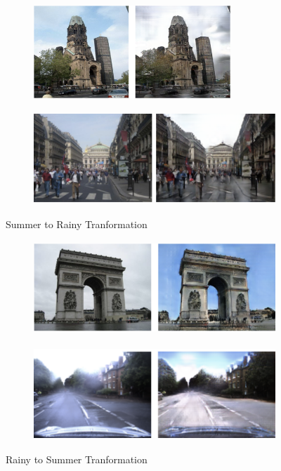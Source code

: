 \documentclass{article}
\begin{document}
\begin{figure}[H]
	\begin{subfigure}{0.5\textwidth}
		\centering
		\includegraphics[width=0.9\linewidth, height=35mm]{images/s2m_1}
	\end{subfigure}
	\begin{subfigure}{.5\textwidth}
		\centering
		\includegraphics[width=.9\linewidth,height=35mm]{images/s2m_2.png}
	\end{subfigure}
	\caption{Summer to Rainy Tranformation}
	\begin{subfigure}{0.5\textwidth}
		\centering
		\includegraphics[width=0.9\linewidth, height=35mm]{images/m2s_1.png}
	\end{subfigure}
	\begin{subfigure}{.5\textwidth}
		\centering
		\includegraphics[width=.9\linewidth,height=35mm]{images/m2s_2.png}
	\end{subfigure}
	\caption{Rainy to Summer Tranformation}
	\label{fig:v1_failure}
\end{figure}
\end{document}
